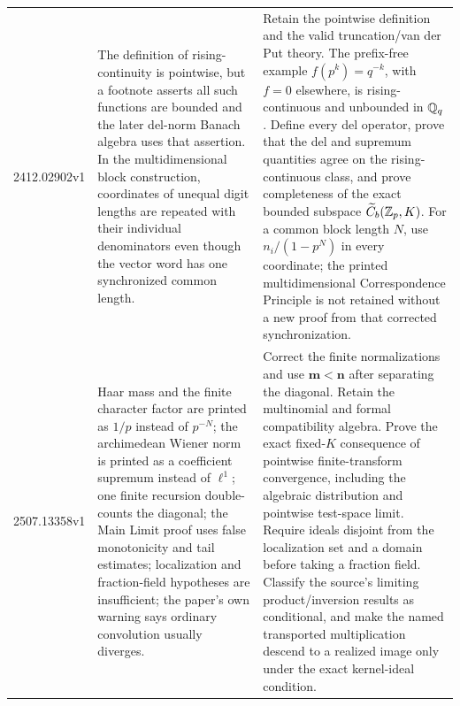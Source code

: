 \begin{longtable}{@{}p{}p{}p{}@{}}
2412.02902v1 & The definition of rising-continuity is pointwise, but a
footnote asserts all such functions are bounded and the later del-norm Banach
algebra uses that assertion.  In the multidimensional block construction,
coordinates of unequal digit lengths are repeated with their individual
denominators even though the vector word has one synchronized common length.
& Retain the pointwise definition and the valid truncation/van der Put
theory.  The prefix-free example
$f(p^k)=q^{-k}$, with $f=0$ elsewhere, is rising-continuous and unbounded in
$\mathbb Q_q$.  Define every del operator, prove that the del and supremum quantities
agree on the rising-continuous class, and prove completeness of the exact
bounded subspace $\widetilde C_b(\mathbb Z_p,K)$.  For a common block length $N$, use
$n_i/(1-p^N)$ in every coordinate; the printed multidimensional
Correspondence Principle is not retained without a new proof from that
corrected synchronization.\\

2507.13358v1 & Haar mass and the finite character factor are printed as
$1/p$ instead of $p^{-N}$; the archimedean Wiener norm is printed as a
coefficient supremum instead of $\ell^1$; one finite recursion double-counts
the diagonal; the Main Limit proof uses false monotonicity and tail
estimates; localization and fraction-field hypotheses are insufficient; the
paper's own warning says ordinary convolution usually diverges. & Correct
the finite normalizations and use $\mathbf m<\mathbf n$ after separating the
diagonal.  Retain the multinomial and formal compatibility algebra.  Prove
the exact fixed-$K$ consequence of pointwise finite-transform convergence,
including the algebraic distribution and pointwise test-space limit.  Require
ideals disjoint from the localization set and a domain before taking a
fraction field.  Classify the source's limiting product/inversion results as
conditional, and make the named transported multiplication descend to a
realized image only under the exact kernel-ideal condition.\\


\end{longtable}
